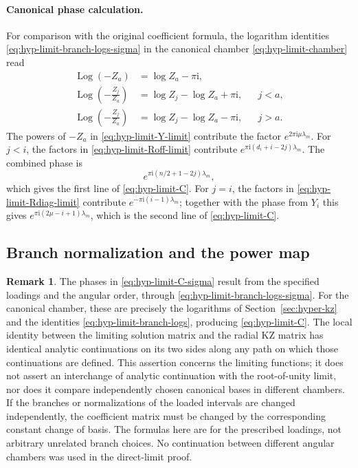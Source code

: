 \documentclass[12pt]{amsart}
\theoremstyle{definition}
\numberwithin{equation}{section}
\theoremstyle{definition}
\newtheorem*{rem}{Remark}
\def\beq{\begin{equation}}
\def\eeq{\end{equation}}
\begin{document}
\paragraph{Canonical phase calculation.}
For comparison with the original coefficient formula, the logarithm
identities \eqref{eq:hyp-limit-branch-logs-sigma} in the canonical
chamber \eqref{eq:hyp-limit-chamber} read
\beq\label{eq:hyp-limit-branch-logs}
 \begin{aligned}
 \operatorname{Log}(-Z_a)
  &=\log Z_a-\pi\mathrm{i},\\
 \operatorname{Log}\left(-\frac{Z_j}{Z_a}\right)
  &=\log Z_j-\log Z_a+\pi\mathrm{i},&&j<a,\\
 \operatorname{Log}\left(-\frac{Z_j}{Z_a}\right)
  &=\log Z_j-\log Z_a-\pi\mathrm{i},&&j>a.
 \end{aligned}
\eeq
The powers of $-Z_a$ in \eqref{eq:hyp-limit-Y-limit}
contribute the factor $e^{2\pi\mathrm{i}\mu\lambda_m}$.
For $j<i$, the factors in
\eqref{eq:hyp-limit-Roff-limit} contribute
$e^{\pi\mathrm{i}(d_i+i-2j)\lambda_m}$.
The combined phase is
\[
 e^{\pi\mathrm{i}(n/2+1-2j)\lambda_m},
\]
which gives the first line of \eqref{eq:hyp-limit-C}.
For $j=i$, the factors in
\eqref{eq:hyp-limit-Rdiag-limit} contribute
$e^{-\pi\mathrm{i}(i-1)\lambda_m}$; together with the
phase from $Y_i$ this gives
$e^{\pi\mathrm{i}(2\mu-i+1)\lambda_m}$,
which is the second line of \eqref{eq:hyp-limit-C}.

\subsection{Branch normalization and the power map}
\label{subsec:hyp-limit-normalizations}

\begin{rem}
The phases in \eqref{eq:hyp-limit-C-sigma} result from the
specified loadings and the angular order, through
\eqref{eq:hyp-limit-branch-logs-sigma}. For the canonical chamber,
these are precisely the logarithms of Section~\ref{sec:hyper-kz}
and the identities \eqref{eq:hyp-limit-branch-logs}, producing
\eqref{eq:hyp-limit-C}. The local identity between the limiting
solution matrix and the radial KZ matrix has identical analytic
continuations on its two sides along any path on which those
continuations are defined. This assertion concerns the limiting
functions; it does not assert an interchange of analytic
continuation with the root-of-unity limit, nor does it compare
independently chosen canonical bases in different chambers.
If the branches or normalizations of the loaded intervals are
changed independently, the coefficient matrix must be changed
by the corresponding constant change of basis.
The formulas here are for the prescribed loadings, not arbitrary
unrelated branch choices. No continuation between different
angular chambers was used in the direct-limit proof.
\end{rem}
\end{document}
